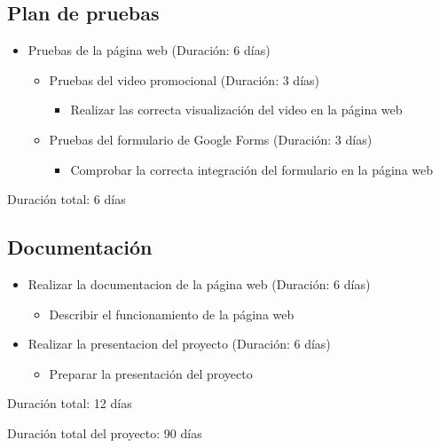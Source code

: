 \documentclass{report}
\begin{document}
            \subsection{Plan de pruebas}
                \begin{itemize}
                    \item Pruebas de la página web (Duración: 6 días)
                    \begin{itemize}
                        \item Pruebas del video promocional (Duración: 3 días)
                        \begin{itemize}
                            \item Realizar las correcta visualización del video en la página web
                        \end{itemize}
                        \item Pruebas del formulario de Google Forms (Duración: 3 días)
                        \begin{itemize}
                            \item Comprobar la correcta integración del formulario en la página web
                        \end{itemize}
                    \end{itemize}
                \end{itemize}
                Duración total: 6 días
            \subsection{Documentación}
                \begin{itemize}
                    \item Realizar la documentacion de la página web (Duración: 6 días)
                    \begin{itemize}
                        \item Describir el funcionamiento de la página web
                    \end{itemize}
                    \item Realizar la presentacion del proyecto (Duración: 6 días)
                    \begin{itemize}
                        \item Preparar la presentación del proyecto
                    \end{itemize}
                \end{itemize}
                Duración total: 12 días
            \vfill
        \begin{center}
            Duración total del proyecto: 90 días
        \end{center}
\end{document}
